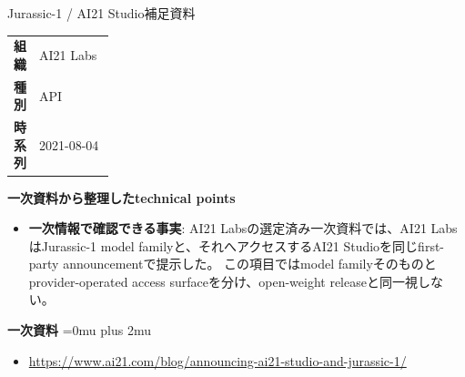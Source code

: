 \begin{technicalnote}{Jurassic-1 / AI21 Studio}{補足資料}
\begingroup
\begin{tabularx}{\linewidth}{@{}>{\bfseries}p{0.22\linewidth}X@{}}
組織 & AI21 Labs \\
種別 & API \\
時系列 & 2021-08-04 \\
\end{tabularx}
\smallskip
\begin{minipage}{\linewidth}
{\bfseries 一次資料から整理したtechnical points}
\begin{itemize}[leftmargin=1.5em,itemsep=0.35em]
\item \textbf{一次情報で確認できる事実}: AI21 Labsの選定済み一次資料では、AI21 LabsはJurassic-1 model familyと、それへアクセスするAI21 Studioを同じfirst-party announcementで提示した。 この項目ではmodel familyそのものとprovider-operated access surfaceを分け、open-weight releaseと同一視しない。
\end{itemize}
\begin{minipage}{\linewidth}
\begin{samepage}
{\bfseries 一次資料}
\begingroup\sloppy
\Urlmuskip=0mu plus 2mu\relax
\begin{itemize}[leftmargin=1.5em,itemsep=0.25em]
\item {\scriptsize\url{https://www.ai21.com/blog/announcing-ai21-studio-and-jurassic-1/}}
\end{itemize}
\endgroup
\end{samepage}
\end{minipage}
\end{minipage}
\endgroup
\end{technicalnote}
\medskip
